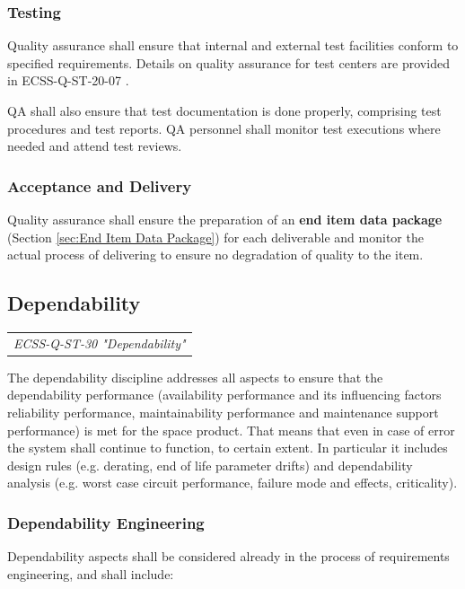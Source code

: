 \subsubsection{Testing}

Quality assurance shall ensure that internal and external test facilities conform to specified requirements. Details on quality assurance for test centers are provided in ECSS-Q-ST-20-07 \cite{ECSS-Q-ST-20-07}.

QA shall also ensure that test documentation is done properly, comprising test procedures and test reports. QA personnel shall monitor test executions where needed and attend test reviews.

\subsubsection{Acceptance and Delivery}

Quality assurance shall ensure the preparation of an \textbf{end item data package} (Section \ref{sec:End Item Data Package}) for each deliverable and monitor the actual process of delivering to ensure no degradation of quality to the item.

\subsection{Dependability}

\begin{tabular}{l}
\textit{ECSS-Q-ST-30 "Dependability" \cite{ECSS-Q-ST-30}}
\end{tabular}

The dependability discipline addresses all aspects to ensure that the dependability performance (availability performance and its influencing factors reliability performance, maintainability performance and maintenance support performance) is met for the space product. That means that even in case of error the system shall continue to function, to certain extent. In particular it includes design rules (e.g. derating, end of life parameter drifts) and dependability analysis (e.g. worst case circuit performance, failure mode and effects, criticality).

\subsubsection{Dependability Engineering}

Dependability aspects shall be considered already in the process of requirements engineering, and shall include:

